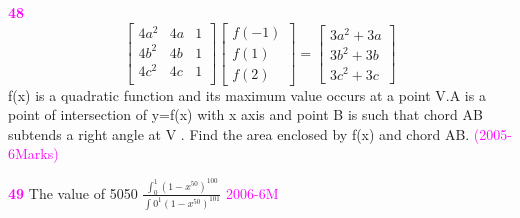\documentclass[journal,12pt,twocolumn]{IEEEtran}
\theoremstyle{remark}
\begin{document}
																									    \textbf{\textcolor{magenta}{48}}
																									       \[
																									          \begin{bmatrix}
																										     4a^2 & 4a & 1\\
																										        4b^2 & 4b & 1\\
																											   4c^2 & 4c & 1\\
																											      \end{bmatrix}
																											         \begin{bmatrix}
																												        f(-1)\\
																													       f(1)\\
																													              f(2)
																														         \end{bmatrix}
																															    =
																															       \begin{bmatrix}
																															          3a^2+3a\\
																																     3b^2+3b\\
																																        3c^2+3c
																																	   \end{bmatrix}
																																	       \]
																																	          f(x) is a quadratic function and its maximum value occurs at a point V.A is a point of intersection of y=f(x) with x axis and point B is such that chord AB subtends a right angle at V . Find the area enclosed by f(x) and chord AB.
																																		    \hfill{\textcolor{magenta}{(2005-6Marks)}}

																																		      \textbf{\textcolor{magenta}{49}}
																																		        The value of 5050 $\frac{\int_{0}^{1}(1-x^50)^100}{\int{0}^{1} {(1-x^50)^101}}$
																																			  \hfill{\textcolor{magenta}{2006-6M}}

																																			     
																																			        
																																				  





																																				    
\end{document}
